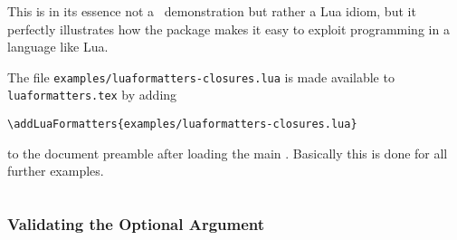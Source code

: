 \documentclass[12pt]{scrartcl}
\begin{document}
This is in its essence not a \luaformatters\ demonstration but rather a Lua idiom, but it perfectly illustrates how the package makes it easy to exploit programming in a language like Lua.

The file \texttt{examples/luaformatters-closures.lua} is made available to \texttt{luaformatters.tex} by adding

\begin{verbatim}
\addLuaFormatters{examples/luaformatters-closures.lua}
\end{verbatim}

\noindent to the document preamble after loading the main .  Basically this is done for all further examples.

\inputminted{lua}{examples/luaformatters-closure.lua}


\subsubsection{Validating the Optional Argument}
\label{sec:examples:validating-optional-argument}

\inputminted{lua}{examples/luaformatters-validate-options.lua}

\inputminted{tex}{examples/luaformatters-validate-options.tex}
\end{document}

